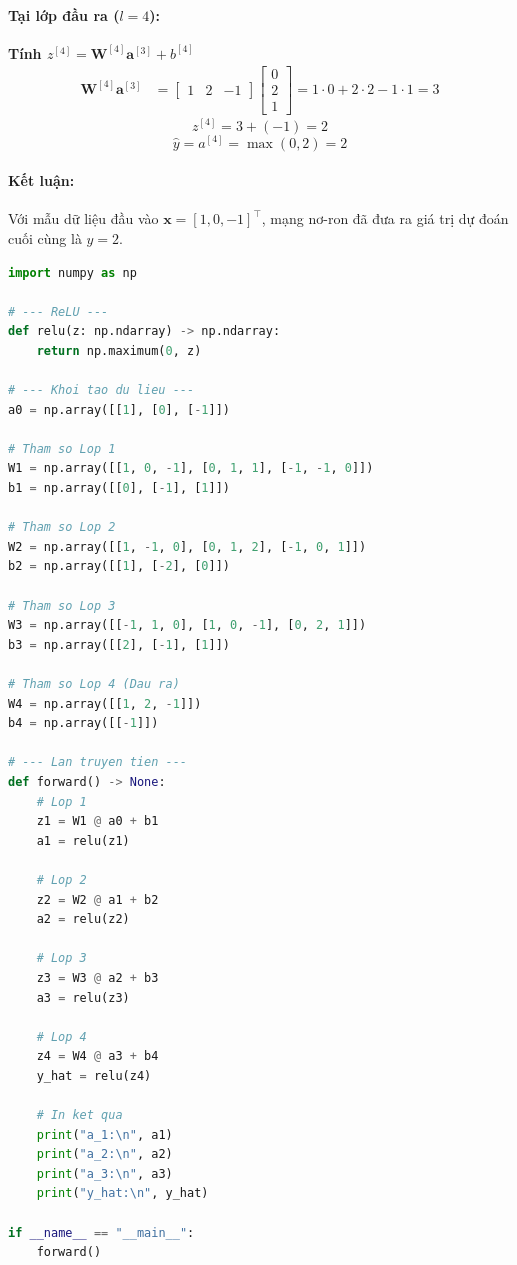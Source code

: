 \paragraph{Tại lớp đầu ra ($l=4$):\\}
\textbf{Tính $z^{[4]} = \mathbf{W}^{[4]}\mathbf{a}^{[3]} + b^{[4]}$}
\begin{align*}
\mathbf{W}^{[4]}\mathbf{a}^{[3]} 
&= 
\begin{bmatrix}
    1 & 2 & -1
\end{bmatrix}
\begin{bmatrix}
    0 \\ 2 \\ 1
\end{bmatrix}
=
1\cdot 0 + 2\cdot 2 - 1\cdot 1 = 3
\end{align*}
\begin{equation}
z^{[4]} = 3 + (-1) = 2
\end{equation}
\begin{equation}
\hat{y} = a^{[4]} = \max(0, 2) = 2
\end{equation}

\paragraph{Kết luận:} 
Với mẫu dữ liệu đầu vào $\mathbf{x} = [1, 0, -1]^\top$, mạng nơ-ron đã đưa ra giá trị dự đoán cuối cùng là $\hat{y} = 2$. 

\begin{lstlisting}[caption={Mã Python cho lan truyền tiến của một mẫu dữ liệu.}, language=Python]
import numpy as np

# --- ReLU ---
def relu(z: np.ndarray) -> np.ndarray:
    return np.maximum(0, z)

# --- Khoi tao du lieu ---
a0 = np.array([[1], [0], [-1]])

# Tham so Lop 1
W1 = np.array([[1, 0, -1], [0, 1, 1], [-1, -1, 0]])
b1 = np.array([[0], [-1], [1]])

# Tham so Lop 2
W2 = np.array([[1, -1, 0], [0, 1, 2], [-1, 0, 1]])
b2 = np.array([[1], [-2], [0]])

# Tham so Lop 3
W3 = np.array([[-1, 1, 0], [1, 0, -1], [0, 2, 1]])
b3 = np.array([[2], [-1], [1]])

# Tham so Lop 4 (Dau ra)
W4 = np.array([[1, 2, -1]])
b4 = np.array([[-1]])

# --- Lan truyen tien ---
def forward() -> None:
    # Lop 1
    z1 = W1 @ a0 + b1
    a1 = relu(z1)

    # Lop 2
    z2 = W2 @ a1 + b2
    a2 = relu(z2)

    # Lop 3
    z3 = W3 @ a2 + b3
    a3 = relu(z3)

    # Lop 4
    z4 = W4 @ a3 + b4
    y_hat = relu(z4)

    # In ket qua
    print("a_1:\n", a1)
    print("a_2:\n", a2)
    print("a_3:\n", a3)
    print("y_hat:\n", y_hat)

if __name__ == "__main__":
    forward()


\end{lstlisting}